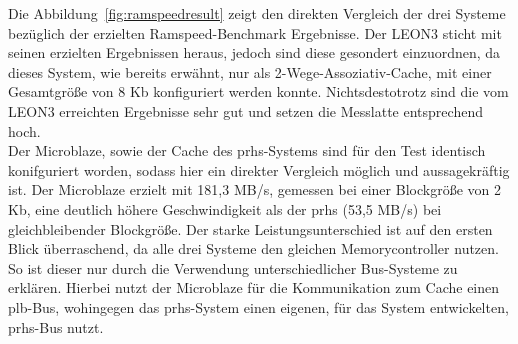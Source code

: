 Die Abbildung~\ref{fig:ramspeedresult} zeigt den direkten Vergleich der drei Systeme bezüglich der erzielten Ramspeed-Benchmark Ergebnisse. Der LEON3 sticht mit seinen erzielten Ergebnissen
heraus, jedoch sind diese gesondert einzuordnen, da dieses System, wie bereits erwähnt, nur als 2-Wege-Assoziativ-Cache, mit einer Gesamtgröße von 8 Kb konfiguriert werden konnte. Nichtsdestotrotz
sind die vom LEON3 erreichten Ergebnisse sehr gut und setzen die Messlatte entsprechend hoch.\\
Der Microblaze, sowie der Cache des \ac{prhs}-Systems sind für den Test identisch konifguriert worden, sodass hier ein direkter Vergleich möglich und aussagekräftig ist.
Der Microblaze erzielt mit 181,3 MB/s, gemessen bei einer Blockgröße von 2 Kb, eine deutlich höhere Geschwindigkeit als der \ac{prhs} (53,5 MB/s) bei gleichbleibender Blockgröße.
Der starke Leistungsunterschied ist auf den ersten Blick überraschend, da alle drei Systeme den gleichen Memorycontroller nutzen. So ist dieser nur durch die Verwendung unterschiedlicher
Bus-Systeme zu erklären. Hierbei nutzt der Microblaze für die Kommunikation zum Cache einen \ac{plb}-Bus, wohingegen das \ac{prhs}-System einen eigenen, für das System entwickelten,
\ac{prhs}-Bus nutzt.\\
